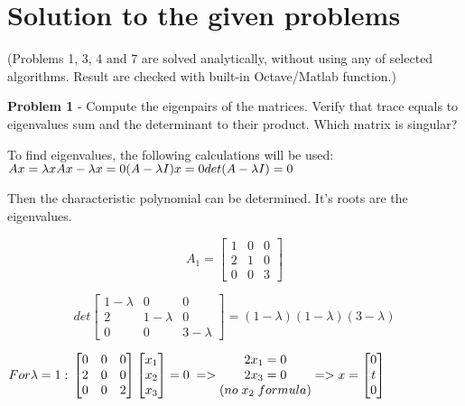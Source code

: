 \documentclass[eng,openany]{mgr}
\author{Jaroslaw M. Szumega}
\title{}
\date{20.03.2017}
\begin{document}
\maketitle

\newpage

\chapter{Solution to the given problems}
(Problems 1, 3, 4 and 7 are solved analytically, without using any of selected algorithms. Result are checked with built-in Octave/Matlab function.)

\textbf{Problem 1} - Compute the eigenpairs of the matrices. Verify that trace equals to eigenvalues sum and the determinant to their product. Which matrix is singular?

To find eigenvalues, the following calculations will be used:\\
\begin{math}
Ax = \lambda x \\
Ax - \lambda x = 0 \\
(A - \lambda I) x = 0 \\
det(A - \lambda I) = 0
\end{math}

Then the characteristic polynomial can be determined. It's roots are the eigenvalues.


\[
A_1 =
\begin{bmatrix}
1 & 0 & 0  \\
2 & 1 & 0 \\
0 & 0 & 3 
\end{bmatrix}
\]

\[
det
\begin{bmatrix}
1 -\lambda & 0 & 0  \\
2 & 1-\lambda & 0 \\
0 & 0 & 3-\lambda 
\end{bmatrix}
=(1-\lambda)(1-\lambda)(3-\lambda)
\]

\begin{math}
For \lambda = 1:\\
\begin{bmatrix}
0 & 0 & 0  \\
2 & 0 & 0 \\
0 & 0 & 2 
\end{bmatrix}
\begin{bmatrix}
x_1 \\
x_2 \\
x_3
\end{bmatrix}
= 0\; =>
\begin{matrix}
2x_1 = 0\\
2x_3 = 0\\
(no\;x_2\;formula)
\end{matrix}
=>
x = 
\begin{bmatrix}
0\\
t \\
0
\end{bmatrix}
\end{math}
\end{document}
